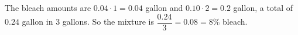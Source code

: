The bleach amounts are $0.04\cdot1=0.04$ gallon and $0.10\cdot2=0.2$ gallon, a total of $0.24$ gallon in $3$ gallons. So the mixture is $\dfrac{0.24}{3}=0.08=\boxed{8\%}$ bleach.
